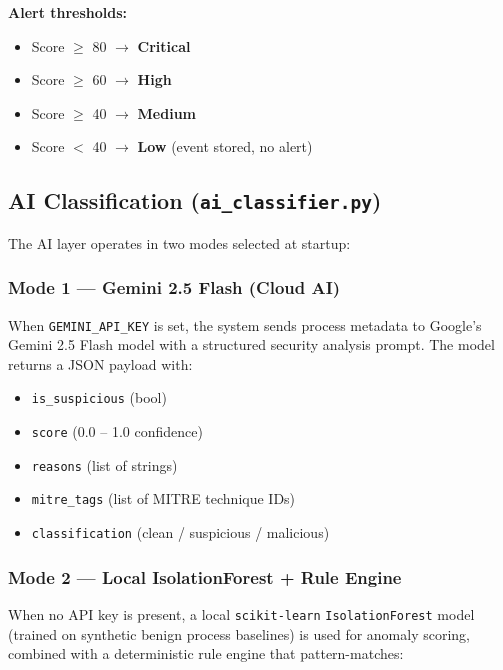 \documentclass[12pt,a4paper]{article}
\begin{document}
\textbf{Alert thresholds:}

\begin{itemize}[noitemsep]
    \item Score $\geq$ 80 $\rightarrow$ \textbf{Critical}
    \item Score $\geq$ 60 $\rightarrow$ \textbf{High}
    \item Score $\geq$ 40 $\rightarrow$ \textbf{Medium}
    \item Score $<$ 40 $\rightarrow$ \textbf{Low} (event stored, no alert)
\end{itemize}

\subsection{AI Classification (\texttt{ai\_classifier.py})}

The AI layer operates in two modes selected at startup:

\subsubsection{Mode 1 — Gemini 2.5 Flash (Cloud AI)}

When \texttt{GEMINI\_API\_KEY} is set, the system sends process metadata to
Google's Gemini 2.5 Flash model with a structured security analysis prompt.
The model returns a JSON payload with:

\begin{itemize}[noitemsep]
    \item \texttt{is\_suspicious} (bool)
    \item \texttt{score} (0.0 – 1.0 confidence)
    \item \texttt{reasons} (list of strings)
    \item \texttt{mitre\_tags} (list of MITRE technique IDs)
    \item \texttt{classification} (clean / suspicious / malicious)
\end{itemize}

\subsubsection{Mode 2 — Local IsolationForest + Rule Engine}

When no API key is present, a local \texttt{scikit-learn} \texttt{IsolationForest}
model (trained on synthetic benign process baselines) is used for anomaly scoring,
combined with a deterministic rule engine that pattern-matches:
\end{document}
